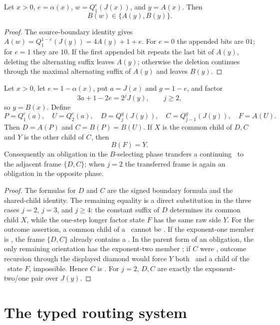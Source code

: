\begin{lemma}\label{lem:a-side}
Let $x>0$, $e=\alpha(x)$, $w=Q_1^e(J(x))$, and $y=A(x)$. Then
\[
  B(w)\in\{A(y),B(y)\}.
\]
\end{lemma}

\begin{proof}
The source-boundary identity gives
$A(w)=Q_1^{1-e}(J(y))=4A(y)+1+e$. For $e=0$ the appended bits are $01$;
for $e=1$ they are $10$. If the first appended bit repeats the last bit of
$A(y)$, deleting the alternating suffix leaves $A(y)$; otherwise the deletion
continues through the maximal alternating suffix of $A(y)$ and leaves
$B(y)$.
\end{proof}

\begin{lemma}\label{lem:b-diamond}
Let $x>0$, let $e=1-\alpha(x)$, put $a=J(x)$ and $g=1-e$, and factor
\[
  3a+1-2e=2^jJ(y),\qquad j\ge2,
\]
so $y=B(x)$. Define
\[
 P=Q_1^e(a),\quad U=Q_2^e(a),\quad
 D=Q_j^g(J(y)),\quad C=Q_{j-1}^g(J(y)),\quad F=A(U).
\]
Then $D=A(P)$ and $C=B(P)=B(U)$. If $X$ is the common child of $D,C$ and
$Y$ is the other child of $C$, then
\[
  B(F)=Y.
\]
Consequently an obligation in the $B$-selecting phase transfers a continuing
\DRAW\ to the adjacent frame $\{D,C\}$; when $j=2$ the transferred frame is
again an obligation in the opposite phase.
\end{lemma}

\begin{proof}
The formulas for $D$ and $C$ are the signed boundary formula and the
shared-child identity. The remaining equality is a direct substitution in the
three cases $j=2$, $j=3$, and $j\ge4$: the constant suffix of $D$ determines
its common child $X$, while the one-step longer factor state $F$ has the same
raw side $Y$. For the outcome assertion, a common child of a \DRAW\ cannot be
\LOSS. If the exponent-one member is \DRAW, the frame $\{D,C\}$ already
contains a \DRAW. In the parent form of an obligation, the only remaining
orientation has the exponent-two member \DRAW; if $C$ were \WIN, outcome
recursion through the displayed diamond would force $Y$ both \LOSS\ and a
child of the \DRAW\ state $F$, impossible. Hence $C$ is \DRAW. For $j=2$,
$D,C$ are exactly the exponent-two/one pair over $J(y)$.
\end{proof}

\section{The typed routing system}

